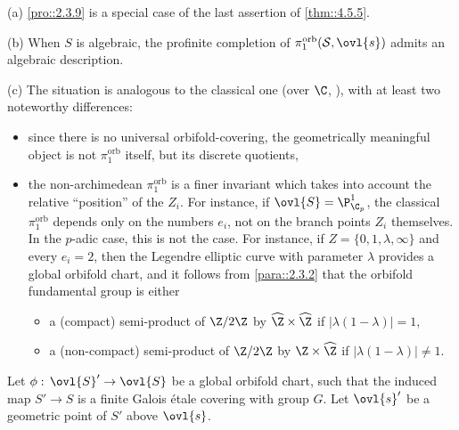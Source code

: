 \begin{rems}
 (a) \ref{pro::2.3.9} is a special case of the
 last assertion of \ref{thm::4.5.5}. 

 (b) When $S$ is algebraic, the profinite completion of
 $\pi_1^{\mathrm{orb}}(\mathcal{S},\ovl{s})$ admits an 
 algebraic description. 

 (c) The situation is analogous to the classical one (over $\C$, ),
 with at least two noteworthy differences: 

 \begin{itemize}
 \item since there is no universal orbifold-covering, the geometrically
       meaningful object is not $\pi_1^{\mathrm{orb}}$ itself, but its
       discrete quotients,
 \item the non-archimedean $\pi_1^{\mathrm{orb}}$ is a finer invariant
       which takes into account the relative ``position'' of the $Z_i$. 
       For instance, if $\ovl{S}= \P^1_{\C_p}$, the classical
       $\pi_1^{\mathrm{orb}}$ 
       depends only on the numbers $e_i$, not on the branch 
       points $Z_i$ themselves. In the $p$-adic case, this is not the case. For
       instance, if $Z=\{0,1,\lambda,\infty\}$ and every 
       $e_i=2$, then the Legendre elliptic curve with parameter $\lambda$
       provides a global orbifold chart, 
       and it follows from \ref{para::2.3.2} that the orbifold fundamental
       group is either
       \begin{itemize}
	\item a (compact) semi-product of $\Z/2\Z$ by $\widehat{\Z}\times
	      \widehat{\Z}$ if $| \lambda(1-\lambda)| =1$,
	\item a (non-compact) semi-product of $\Z/2\Z$ by $ \Z\times
	      \widehat{\Z}$ if $| \lambda(1-\lambda)| \neq 1$.
       \end{itemize}
 \end{itemize}
\end{rems}

\begin{para}\label{para::4.5.6} Let $\phi:\,\ovl{S}'\to \ovl{S}$ be a global
 orbifold chart, such that the induced map $S'\to S$ is a 
finite Galois \'etale covering with group $G$. Let $\ovl{s}'$ be a
 geometric point of $S'$ above $\ovl{s}$.
\end{para}

